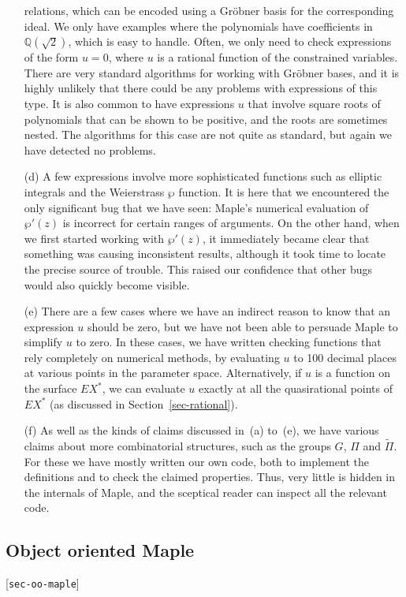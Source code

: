 \documentclass[reqno]{amsart}
\newcommand{\lbl}[1]{\label{#1}\textup{[\texttt{#1}]}\par}
\newcommand{\lbl}{\label}
\newcommand{\Q}         {{\mathbb{Q}}}
\newcommand{\rt}        {\sqrt{2}}
\newcommand{\tPi}	{\widetilde{\Pi}}
\renewcommand{\:}{\colon}
\theoremstyle{definition}
\begin{document}
\begin{itemize}
  relations, which can be encoded using a Gr\"obner basis for the
  corresponding ideal.  We only have examples where the polynomials
  have coefficients in $\Q(\rt)$, which is easy to handle.  Often,
  we only need to check expressions of the form $u=0$, where $u$ is a
  rational function of the constrained variables.  There are
  very standard algorithms for working with Gr\"obner bases, and it is
  highly unlikely that there could be any problems with expressions of
  this type.  It is also common to have expressions $u$ that involve
  square roots of polynomials that can be shown to be positive, and
  the roots are sometimes nested.  The algorithms for this case are
  not quite as standard, but again we have detected no problems.
 \item[(d)] A few expressions involve more sophisticated functions
  such as elliptic integrals and the Weierstrass $\wp$ function.  It
  is here that we encountered the only significant bug that we have
  seen: Maple's numerical evaluation of $\wp'(z)$ is incorrect for
  certain ranges of arguments.  On the other hand, when we first
  started working with $\wp'(z)$, it immediately became clear that
  something was causing inconsistent results, although it took time to
  locate the precise source of trouble.  This raised our confidence
  that other bugs would also quickly become visible.
 \item[(e)] There are a few cases where we have an indirect reason to
  know that an expression $u$ should be zero, but we have not been
  able to persuade Maple to simplify $u$ to zero.  In these cases, we
  have written checking functions that rely completely on numerical
  methods, by evaluating $u$ to 100 decimal places at various points
  in the parameter space.  Alternatively, if $u$ is a function on the
  surface $EX^*$, we can evaluate $u$ exactly at all the quasirational
  points of $EX^*$ (as discussed in Section~\ref{sec-rational}).
 \item[(f)] As well as the kinds of claims discussed in~(a) to~(e), we
  have various claims about more combinatorial structures, such as the
  groups $G$, $\Pi$ and $\tPi$.  For these we have mostly written our
  own code, both to implement the definitions and to check the claimed
  properties.  Thus, very little is hidden in the internals of Maple,
  and the sceptical reader can inspect all the relevant code.
\end{itemize}

\subsection{Object oriented Maple}
\lbl{sec-oo-maple}
\end{document}
